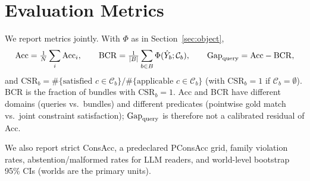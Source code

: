 \section{Evaluation Metrics}
\label{sec:metrics}

We report metrics jointly. With $\Phi$ as in Section~\ref{sec:object},
\begin{equation}
\mathrm{Acc}=\tfrac{1}{N}\sum_i \mathrm{Acc}_i,\qquad
\mathrm{BCR}=\tfrac{1}{|B|}\sum_{b\in B}\Phi(\hat Y_b;\mathcal{C}_b),\qquad
\mathrm{Gap}_{\mathrm{query}}=\mathrm{Acc}-\mathrm{BCR},
\label{eq:accbcr}
\end{equation}
and $\mathrm{CSR}_b=\#\{\text{satisfied }c\in\mathcal{C}_b\}/\#\{\text{applicable }c\in\mathcal{C}_b\}$ (with $\mathrm{CSR}_b=1$ if $\mathcal{C}_b=\emptyset$). BCR is the fraction of bundles with $\mathrm{CSR}_b=1$. Acc and BCR have different domains (queries vs.\ bundles) and different predicates (pointwise gold match vs.\ joint constraint satisfaction); $\mathrm{Gap}_{\mathrm{query}}$ is therefore not a calibrated residual of Acc.

We also report strict ConsAcc, a predeclared PConsAcc grid, family violation rates, abstention/malformed rates for LLM readers, and world-level bootstrap 95\% CIs (worlds are the primary units).
